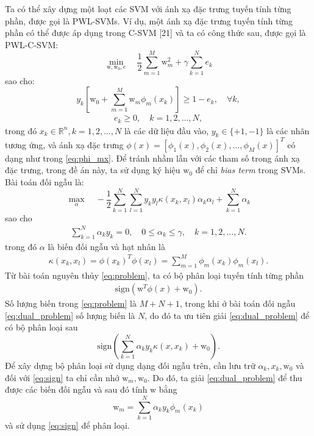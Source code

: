 Ta có thể xây dựng một loạt các SVM với ánh xạ đặc trưng tuyến tính từng phần, được gọi là PWL-SVMs. Ví dụ, một ánh xạ đặc trưng tuyến tính từng phần có thể được áp dụng trong C-SVM [21] và ta có công thức sau, được gọi là PWL-C-SVM:
\[
\min_{\text{w}, \text{w}_0, e} \quad \frac{1}{2} \sum_{m=1}^{M} \text{w}_m^2 + \gamma \sum_{k=1}^{N} e_k
\]
sao cho:
\[
y_k \left[ \text{w}_0 + \sum_{m=1}^{M} \text{w}_m \phi_m(x_k) \right] \geq 1 - e_k, \quad \forall k,
\]
\begin{align}
    e_k \geq 0, \quad k = 1, 2, \ldots, N,
    \label{eq:problem}
\end{align}
trong đó \( x_k \in \mathbb{R}^n, k = 1, 2, \ldots, N \) là các dữ liệu đầu vào, \( y_k \in \{+1, -1\} \) là các nhãn tương ứng, và ánh xạ đặc trưng \( \phi(x) = [\phi_1(x), \phi_2(x), \ldots, \phi_M(x)]^T \) có dạng như trong \eqref{eq:phi_mx}. Để tránh nhầm lẫn với các tham số trong ánh xạ đặc trưng, trong đề án này, ta sử dụng ký hiệu \( \text{w}_0 \) để chỉ \textit{bias term} trong SVMs. Bài toán đối ngẫu là:
\[
\max_{\alpha} \quad -\frac{1}{2} \sum_{k=1}^{N} \sum_{l=1}^{N} y_k y_l \kappa(x_k, x_l) \alpha_k \alpha_l + \sum_{k=1}^{N} \alpha_k
\]
sao cho 
\begin{align}
    \sum_{k=1}^{N} \alpha_k y_k = 0, \quad 0 \leq \alpha_k \leq \gamma, \quad k = 1, 2, \ldots, N.
    \label{eq:dual_problem}
\end{align}
trong đó \( \alpha \) là biến đối ngẫu và hạt nhân là
\begin{align}
    \kappa(x_k, x_l) = \phi(x_k)^T \phi(x_l) = \sum_{m=1}^{M} \phi_m(x_k) \phi_m(x_l).
    \label{eq:kernel}
\end{align}
Từ bài toán nguyên thủy \eqref{eq:problem}, ta có bộ phân loại tuyến tính từng phần
\begin{align}
\text{sign} \left( \text{w}^T \phi(x) + \text{w}_0 \right).
\label{eq:sign}
\end{align}
Số lượng biến trong \eqref{eq:problem} là \( M + N + 1 \), trong khi ở bài toán đối ngẫu \eqref{eq:dual_problem} số lượng biến là \( N \), do đó ta ưu tiên giải \eqref{eq:dual_problem} để có bộ phân loại sau
\[
\text{sign} \left( \sum_{k=1}^{N} \alpha_k y_k \kappa(x, x_k) + \text{w}_0 \right).
\]
Để xây dựng bộ phân loại sử dụng dạng đối ngẫu trên, cần lưu trữ \( \alpha_k, x_k, \text{w}_0 \) và đối với \eqref{eq:sign} ta chỉ cần nhớ \( \text{w}_m, \text{w}_0 \). Do đó, ta giải \eqref{eq:dual_problem} để thu được các biến đối ngẫu và sau đó tính \( \text{w} \) bằng
\[
\text{w}_m = \sum_{k=1}^{N} \alpha_k y_k \phi_m(x_k)
\]
và sử dụng \eqref{eq:sign} để phân loại.

